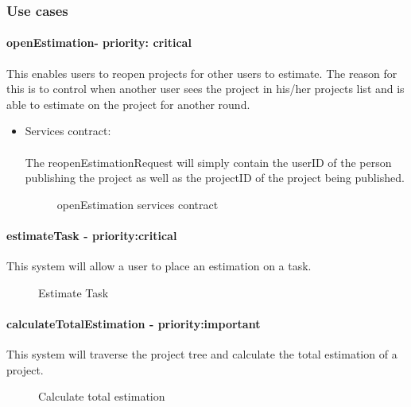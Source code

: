 \subsubsection{Use cases}
	\paragraph{openEstimation- priority: critical}
	This enables users to reopen projects for other users to estimate. The reason for this is to control when another user sees the project in his/her projects list and is able to estimate on the project for another round.

	\begin{itemize}
		\item Services contract:\\ \\
		The reopenEstimationRequest will simply contain the userID of the person publishing the project as well as the projectID of the project being published.
		\begin{figure}[H]
	    	\centering
	    	\caption{openEstimation services contract}
	    	\label{fig:publishProject}
	   	\end{figure}
	\end{itemize}


	\paragraph{estimateTask - priority:critical}This system will allow a user to place an estimation on a task.
	\begin{figure}[H]
	    	\centering
	    	\caption{Estimate Task}
	    	\label{fig:Estimation_estimateTask.png}
   	\end{figure}

	\paragraph{calculateTotalEstimation - priority:important}This system will traverse the project tree and calculate the total estimation of a project.
	\begin{figure}[H]
	    	\centering
	    	\caption{Calculate total estimation}
	    	\label{fig:Estimation_calculateTotalEstimation.png}
   	\end{figure}

